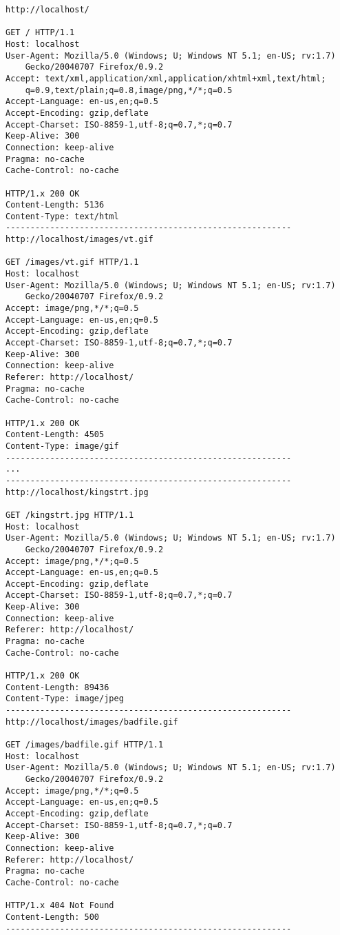 \documentclass[11pt]{report}
\begin{document}
\begin{verbatim}
http://localhost/

GET / HTTP/1.1
Host: localhost
User-Agent: Mozilla/5.0 (Windows; U; Windows NT 5.1; en-US; rv:1.7)
	Gecko/20040707 Firefox/0.9.2
Accept: text/xml,application/xml,application/xhtml+xml,text/html;
	q=0.9,text/plain;q=0.8,image/png,*/*;q=0.5
Accept-Language: en-us,en;q=0.5
Accept-Encoding: gzip,deflate
Accept-Charset: ISO-8859-1,utf-8;q=0.7,*;q=0.7
Keep-Alive: 300
Connection: keep-alive
Pragma: no-cache
Cache-Control: no-cache

HTTP/1.x 200 OK
Content-Length: 5136
Content-Type: text/html
----------------------------------------------------------
http://localhost/images/vt.gif

GET /images/vt.gif HTTP/1.1
Host: localhost
User-Agent: Mozilla/5.0 (Windows; U; Windows NT 5.1; en-US; rv:1.7)
	Gecko/20040707 Firefox/0.9.2
Accept: image/png,*/*;q=0.5
Accept-Language: en-us,en;q=0.5
Accept-Encoding: gzip,deflate
Accept-Charset: ISO-8859-1,utf-8;q=0.7,*;q=0.7
Keep-Alive: 300
Connection: keep-alive
Referer: http://localhost/
Pragma: no-cache
Cache-Control: no-cache

HTTP/1.x 200 OK
Content-Length: 4505
Content-Type: image/gif
----------------------------------------------------------
...
----------------------------------------------------------
http://localhost/kingstrt.jpg

GET /kingstrt.jpg HTTP/1.1
Host: localhost
User-Agent: Mozilla/5.0 (Windows; U; Windows NT 5.1; en-US; rv:1.7)
	Gecko/20040707 Firefox/0.9.2
Accept: image/png,*/*;q=0.5
Accept-Language: en-us,en;q=0.5
Accept-Encoding: gzip,deflate
Accept-Charset: ISO-8859-1,utf-8;q=0.7,*;q=0.7
Keep-Alive: 300
Connection: keep-alive
Referer: http://localhost/
Pragma: no-cache
Cache-Control: no-cache

HTTP/1.x 200 OK
Content-Length: 89436
Content-Type: image/jpeg
----------------------------------------------------------
http://localhost/images/badfile.gif

GET /images/badfile.gif HTTP/1.1
Host: localhost
User-Agent: Mozilla/5.0 (Windows; U; Windows NT 5.1; en-US; rv:1.7)
	Gecko/20040707 Firefox/0.9.2
Accept: image/png,*/*;q=0.5
Accept-Language: en-us,en;q=0.5
Accept-Encoding: gzip,deflate
Accept-Charset: ISO-8859-1,utf-8;q=0.7,*;q=0.7
Keep-Alive: 300
Connection: keep-alive
Referer: http://localhost/
Pragma: no-cache
Cache-Control: no-cache

HTTP/1.x 404 Not Found
Content-Length: 500
----------------------------------------------------------
\end{verbatim}
\end{document}
